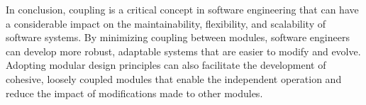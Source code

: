 In conclusion, coupling is a critical concept in software engineering that can have a
considerable impact on the maintainability, flexibility, and scalability of software
systems. By minimizing coupling between modules, software engineers can develop more
robust, adaptable systems that are easier to modify and evolve. Adopting modular design
principles can also facilitate the development of cohesive, loosely coupled modules that
enable the independent operation and reduce the impact of modifications made to other
modules.